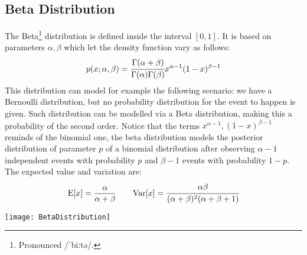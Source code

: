 \begin{center}
\end{center}
%
%
\subsection{Beta Distribution}
The Beta\footnote{Pronounced /ˈbiːtə/.} distribution is defined inside the interval $[0,1]$. \newline
It is based on parameters $\alpha, \beta$ which let the density function vary as follows:
\begin{equation}
	p(x;\alpha,\beta)=\cfrac{\Gamma(\alpha+\beta)}{\Gamma(\alpha)\Gamma(\beta)}x^{\alpha-1}(1-x)^{\beta-1}
	\label{eq:BetaDensityFunction}
\end{equation}
This distribution can model for example the following scenario: we have a Bernoulli distribution, but no probability distribution for the event to happen is given. Such distribution can be modelled via a Beta distribution, making this a probability of the second order. \newline
Notice that the terms $x^{\alpha-1}, (1-x)^{\beta-1}$ reminds of the binomial one, the beta distribution models the posterior distribution of parameter $p$ of a binomial distribution after observing $\alpha-1$ independent events with probability $p$ and $\beta-1$ events with probability $1-p$.\newline
The expected value and variation are:
\begin{equation}
	\text{E}[x]=\frac{\alpha}{\alpha+\beta}\qquad \text{Var}[x]=\cfrac{\alpha\beta}{(\alpha+\beta)^2(\alpha+\beta+1)}
	\label{eq:BetaStatistics}
\end{equation}
\begin{center}
	\texttt{[image: BetaDistribution]}
\end{center}
%
%
